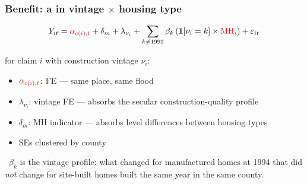 \documentclass[11pt,xcolor={dvipsnames},hyperref={pdftex,pdfpagemode=UseNone,hidelinks,pdfdisplaydoctitle=true},usepdftitle=false,aspectratio=169]{beamer}
\begin{document}

\begin{frame}
\end{frame}


\begin{frame}
    \frametitle{Benefit: a  in vintage $\times$ housing type}

    $$Y_{it} = \al{\alpha_{c(i),t}} + \delta_m + \lambda_{\nu_i} + \sum_{k \neq 1992} \beta_k \left(\mathbf{1}[\nu_i = k] \times \al{\text{MH}_i}\right) + \varepsilon_{it}$$

    \vspace{0.5em}

    for claim $i$ with construction vintage $\nu_i$:

    \begin{itemize}\setlength{\itemsep}{0.3em}
        \item $\al{\alpha_{c(i),t}}$:  FE --- same place, same flood
        \item $\lambda_{\nu_i}$: vintage FE  --- absorbs the secular construction-quality profile
        \item $\delta_m$: MH indicator --- absorbs level differences between housing types
        \item SEs clustered by county
    \end{itemize}

    \vspace{0.8em}
    \pause

    \so\ $\beta_k$ is the  vintage profile: what changed for manufactured homes at 1994 that did \emph{not} change for site-built homes built the same year in the same county.

\end{frame}
\end{document}
